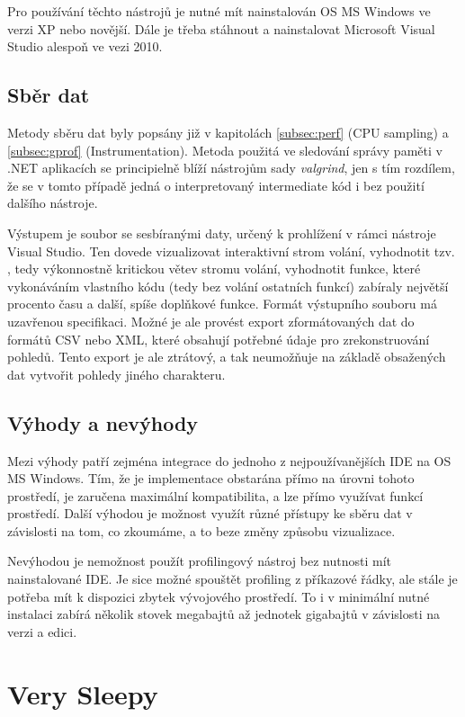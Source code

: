 \documentclass[czech,BP]{thesiskiv}
\begin{document}
Pro používání těchto nástrojů je nutné mít nainstalován OS MS Windows ve verzi XP nebo novější. Dále je třeba stáhnout a nainstalovat Microsoft Visual Studio alespoň ve vezi 2010.

\subsection*{Sběr dat}

Metody sběru dat byly popsány již v kapitolách \ref{subsec:perf} (CPU sampling) a \ref{subsec:gprof} (Instrumentation). Metoda použitá ve sledování správy paměti v .NET aplikacích se principielně blíží nástrojům sady \emph{valgrind}, jen s tím rozdílem, že se v tomto případě jedná o interpretovaný intermediate kód i bez použití dalšího nástroje.

Výstupem je soubor se sesbíranými daty, určený k prohlížení v rámci nástroje Visual Studio. Ten dovede vizualizovat interaktivní strom volání, vyhodnotit tzv. , tedy výkonnostně kritickou větev stromu volání, vyhodnotit funkce, které vykonáváním vlastního kódu (tedy bez volání ostatních funkcí) zabíraly největší procento času a další, spíše doplňkové funkce. Formát výstupního souboru má uzavřenou specifikaci. Možné je ale provést export zformátovaných dat do formátů CSV nebo XML, které obsahují potřebné údaje pro zrekonstruování pohledů. Tento export je ale ztrátový, a tak neumožňuje na základě obsažených dat vytvořit pohledy jiného charakteru.

\subsection*{Výhody a nevýhody}

Mezi výhody patří zejména integrace do jednoho z nejpoužívanějších IDE na OS MS Windows. Tím, že je implementace obstarána přímo na úrovni tohoto prostředí, je zaručena maximální kompatibilita, a lze přímo využívat funkcí prostředí. Další výhodou je možnost využít různé přístupy ke sběru dat v závislosti na tom, co zkoumáme, a to beze změny způsobu vizualizace.

Nevýhodou je nemožnost použít profilingový nástroj bez nutnosti mít nainstalované IDE. Je sice možné spouštět profiling z příkazové řádky, ale stále je potřeba mít k dispozici zbytek vývojového prostředí. To i v minimální nutné instalaci zabírá několik stovek megabajtů až jednotek gigabajtů v závislosti na verzi a edici.




\section{Very Sleepy}
\end{document}

